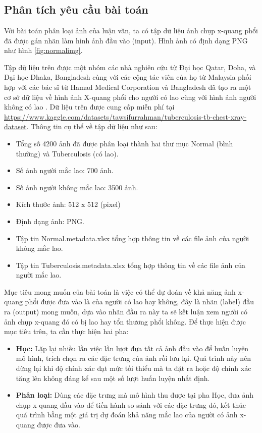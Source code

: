 \setcounter{chapter}{2}
\setcounter{section}{1}
\chapter{\tenchuongiii}
\section{Phân tích yêu cầu bài toán}
Với bài toán phân loại ảnh của luận văn, ta có tập dữ liệu ảnh chụp x-quang phổi đã được gán nhãn làm hình ảnh đầu vào (input). Hình ảnh có định dạng PNG như hình \ref{fig:normalimg}.

Tập dữ liệu trên được một nhóm các nhà nghiên cứu từ Đại học Qatar, Doha, và Đại học Dhaka, Bangladesh cùng với các cộng tác viên của họ từ Malaysia phối hợp với các bác sĩ từ Hamad Medical Corporation và Bangladesh đã tạo ra một cơ sở dữ liệu về hình ảnh X-quang phổi cho người có lao cùng với hình ảnh người không có lao \cite{dataset}. Dữ liệu trên được cung cấp miễn phí tại \href{https://www.kaggle.com/datasets/tawsifurrahman/tuberculosis-tb-chest-xray-dataset}{https://www.kaggle.com/datasets/tawsifurrahman/tuberculosis-tb-chest-xray-dataset}. Thông tin cụ thể về tập dữ liệu như sau:
\begin{itemize}
	\item Tổng số 4200 ảnh đã được phân loại thành hai thư mục Normal (bình thường) và Tuberculosis (có lao).
	\item Số ảnh người mắc lao: 700 ảnh.
	\item Số ảnh người không mắc lao: 3500 ảnh.
	\item Kích thước ảnh: 512 x 512 (pixel)
	\item Định dạng ảnh: PNG.
	\item Tập tin Normal.metadata.xlsx tổng hợp thông tin về các file ảnh của người không mắc lao.
	\item Tập tin Tuberculosis.metadata.xlsx tổng hợp thông tin về các file ảnh của người mắc lao.
\end{itemize}

Mục tiêu mong muốn của bài toán là việc có thể dự đoán về khả năng ảnh x-quang phổi được đưa vào là của người có lao hay không, đây là nhãn (label) đầu ra (output) mong muốn, dựa vào nhãn đầu ra này ta sẽ kết luận xem người có ảnh chụp x-quang đó có bị lao hay tổn thương phổi không. Để thực hiện được mục tiêu trên, ta cần thực hiện hai pha:
\begin{itemize}
	\item \textbf{Học:} Lặp lại nhiều lần việc lần lượt đưa tất cả ảnh đầu vào để huấn luyện mô hình, trích chọn ra các đặc trưng của ảnh rồi lưu lại. Quá trình này nên dừng lại khi độ chính xác đạt mức tối thiểu mà ta đặt ra hoặc độ chính xác tăng lên không đáng kể sau một số lượt huấn luyện nhất định. 
	\item \textbf{Phân loại:} Dùng các đặc trưng mà mô hình thu được tại pha Học, đưa ảnh chụp x-quang đầu vào để tiến hành so sánh với các đặc trưng đó, kết thúc quá trình bằng một giá trị dự đoán khả năng mắc lao của người có ảnh x-quang được đưa vào.
\end{itemize}

